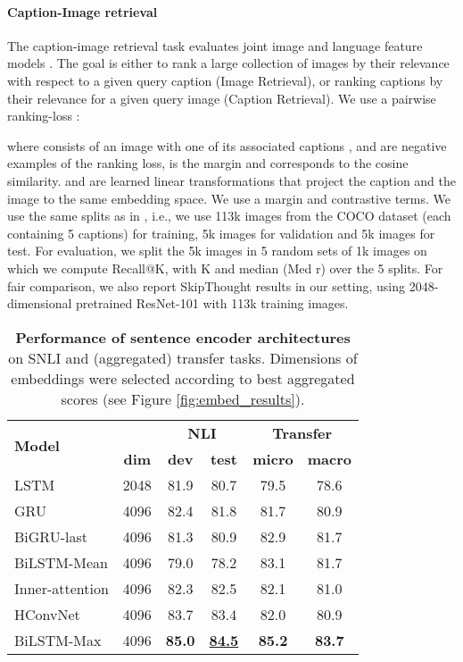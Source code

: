 \documentclass[11pt,letterpaper]{article}
\begin{document}
\paragraph{Caption-Image retrieval}
The caption-image retrieval task evaluates joint image and language feature models \cite{hodosh2013flickr,lin2014microsoft}. The goal is either to rank a large collection of images by their relevance with respect to a given query caption (Image Retrieval), or ranking captions by their relevance for a given query image (Caption Retrieval). We use a pairwise ranking-loss :



where  consists of an image  with one of its associated captions ,  and  are negative examples of the ranking loss,  is the margin and  corresponds to the cosine similarity.  and  are learned linear transformations that project the caption  and the image  to the same embedding space. We use a margin  and  contrastive terms. We use the same splits as in \cite{karpathy2015deep}, i.e., we use 113k images from the COCO dataset (each containing 5 captions) for training, 5k images for validation and 5k images for test. For evaluation, we split the 5k images in 5 random sets of 1k images on which we compute Recall@K, with K  and median (Med r) over the 5 splits. For fair comparison, we also report SkipThought results in our setting, using 2048-dimensional pretrained ResNet-101 \cite{he2016resnet} with 113k training images.

\begin{table}[h!]
{
\small
\centering
  \begin{tabular}{l|c|cc|cc}
    \multirow{2}{*}{\bf Model} &
      \multicolumn{1}{c|}{} &
      \multicolumn{2}{c|}{\bf NLI} &
      \multicolumn{2}{c}{\bf Transfer}\\
     & \bf dim & \bf dev & \bf test & \bf micro & \bf macro \\
    \hline
    LSTM & 2048 & 81.9 & 80.7 & 79.5 & 78.6 \\
    GRU & 4096 & 82.4 & 81.8 & 81.7 & 80.9 \\
    BiGRU-last & 4096 & 81.3 & 80.9 & 82.9 & 81.7 \\
    BiLSTM-Mean & 4096 & 79.0 & 78.2 & 83.1 & 81.7 \\
    Inner-attention & 4096 &  82.3 & 82.5 & 82.1 & 81.0 \\
    HConvNet & 4096 &  83.7 & 83.4 & 82.0 & 80.9 \\
    BiLSTM-Max & 4096 & \bf 85.0 & \bf \underline{84.5} & \bf 85.2 & \bf 83.7 \\

  \end{tabular}
\caption{\label{table:archi_results} {\bf Performance of sentence encoder architectures} on SNLI and (aggregated) transfer tasks. Dimensions of embeddings were selected according to best aggregated scores (see Figure \ref{fig:embed_results}).}

}\end{table}
\end{document}
